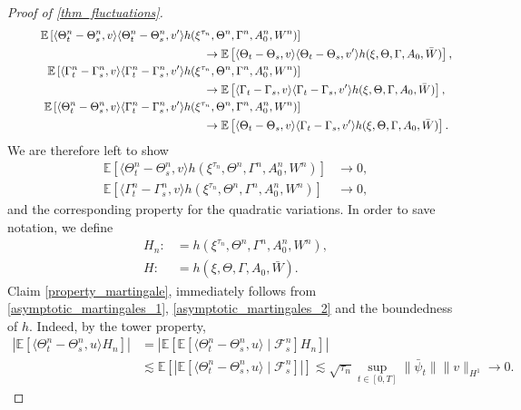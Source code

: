 \documentclass[a4paper,10pt]{amsart}
\theoremstyle{remark}
\numberwithin{equation}{section}
\begin{document}
\begin{proof}[Proof of \cref{thm_fluctuations}]
\begin{align}
    \notag\hspace{1cm}\mathbb{E}\left[\langle \Theta^n_t-\Theta^n_s,v\rangle\langle \Theta^n_t-\Theta^n_s,v'\rangle  h(\xi^{\tau_n},\Theta^n,\Gamma^n, A^n_0,W^n)\right]\\ &\hspace{-3cm}\rightarrow \mathbb{E}\left[\langle \Theta_t-\Theta_s,v\rangle\langle \Theta_t-\Theta_s,v'\rangle h(\xi,\Theta,\Gamma, A_0,\bar{W})\right],
    \\ \mathbb{E}\left[\langle \Gamma^n_t-\Gamma^n_s,v\rangle\langle \Gamma^n_t-\Gamma^n_s,v'\rangle  h(\xi^{\tau_n},\Theta^n,\Gamma^n, A^n_0,W^n)\right]\notag\\ &\hspace{-3cm}\rightarrow \mathbb{E}\left[\langle \Gamma_t-\Gamma_s,v\rangle\langle \Gamma_t-\Gamma_s,v'\rangle h(\xi,\Theta,\Gamma, A_0,\bar{W})\right],\\ \mathbb{E}\left[\langle \Theta^n_t-\Theta^n_s,v\rangle\langle \Gamma^n_t-\Gamma^n_s,v'\rangle  h(\xi^{\tau_n},\Theta^n,\Gamma^n, A^n_0,W^n)\right]\notag\\ &\hspace{-3cm}\rightarrow \mathbb{E}\left[\langle \Theta_t-\Theta_s,v\rangle\langle \Gamma_t-\Gamma_s,v'\rangle h(\xi,\Theta,\Gamma, A_0,\bar{W})\right].
\end{align}
We are therefore left to show
\begin{align}\label{property_martingale}
    \mathbb{E}\left[\langle \Theta^n_t-\Theta^n_s,v\rangle h(\xi^{\tau_n},\Theta^n,\Gamma^n, A^n_0,W^n)\right]&\rightarrow 0,\\  \label{property_martingale_2}\mathbb{E}\left[\langle \Gamma^n_t-\Gamma^n_s,v\rangle h(\xi^{\tau_n},\Theta^n,\Gamma^n, A^n_0,W^n)\right]&\rightarrow 0,
\end{align}
and the corresponding property for the quadratic variations. In order to save notation, we define
\begin{align*}
    H_n:&=h(\xi^{\tau_n},\Theta^n,\Gamma^n, A^n_0,W^n),\\
    H:&=h(\xi,\Theta,\Gamma, A_0,\bar{W}).
\end{align*}
Claim \eqref{property_martingale}, immediately follows from \eqref{asymptotic_martingales_1}, \eqref{asymptotic_martingales_2} and the boundedness of $h$.
Indeed, by the tower property, 
\begin{align*}
    \left\lvert\mathbb{E}\left[\langle \Theta^n_t-\Theta^n_s,u\rangle H_n\right]\right\rvert  & =\left\lvert\mathbb{E}\left[\mathbb{E}\left[\langle \Theta^n_t-\Theta^n_s,u\rangle\mid \mathcal{F}^n_s\right] H_n\right]\right\rvert\\& \lesssim \mathbb{E}\left[\left\lvert\mathbb{E}\left[\langle \Theta^n_t-\Theta^n_s,u\rangle\mid \mathcal{F}^n_s\right] \right\rvert\right] \lesssim \sqrt{\tau_n}\sup_{t\in [0,T]}\|\bar{\psi}_t\|\|v\|_{H^1}\rightarrow 0.

\end{align*}
\end{proof}
\end{document}
